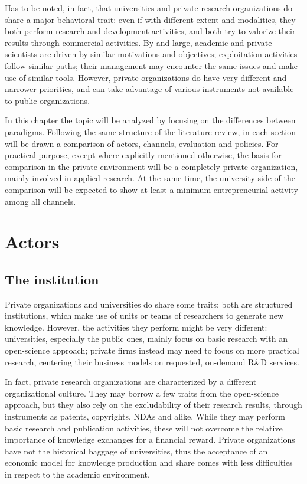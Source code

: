 Has to be noted, in fact, that universities and private research organizations do share a major behavioral trait: even if with different extent and modalities, they both perform research and development activities, and both try to valorize their results through commercial activities. By and large, academic and private scientists are driven by similar motivations and objectives; exploitation activities follow similar paths; their management may encounter the same issues and make use of similar tools. However, private organizations do have very different and narrower priorities, and can take advantage of various instruments not available to public organizations. 

In this chapter the topic will be analyzed by focusing on the differences between paradigms. Following the same structure of the literature review, in each section will be drawn a comparison of actors, channels, evaluation and policies. For practical purpose, except where explicitly mentioned otherwise, the basis for comparison in the private environment will be a completely private organization, mainly involved in applied research. At the same time, the university side of the comparison will be expected to show at least a minimum entrepreneurial activity among all channels. 

\section{Actors}

\subsection{The institution}

Private organizations and universities do share some traits: both are structured institutions, which make use of units or teams of researchers to generate new knowledge. However, the activities they perform might be very different: universities, especially the public ones, mainly focus on basic research with an open-science approach; private firms instead may need to focus on more practical research, centering their business models on requested, on-demand R\&D services.

In fact, private research organizations are characterized by a different organizational culture. They may borrow a few traits from the open-science approach, but they also rely on the excludability of their research results, through instruments as patents, copyrights, NDAs and alike. While they may perform basic research and publication activities, these will not overcome the relative importance of knowledge exchanges for a financial reward. Private organizations have not the historical baggage of universities, thus the acceptance of an economic model for knowledge production and share comes with less difficulties in respect to the academic environment.

